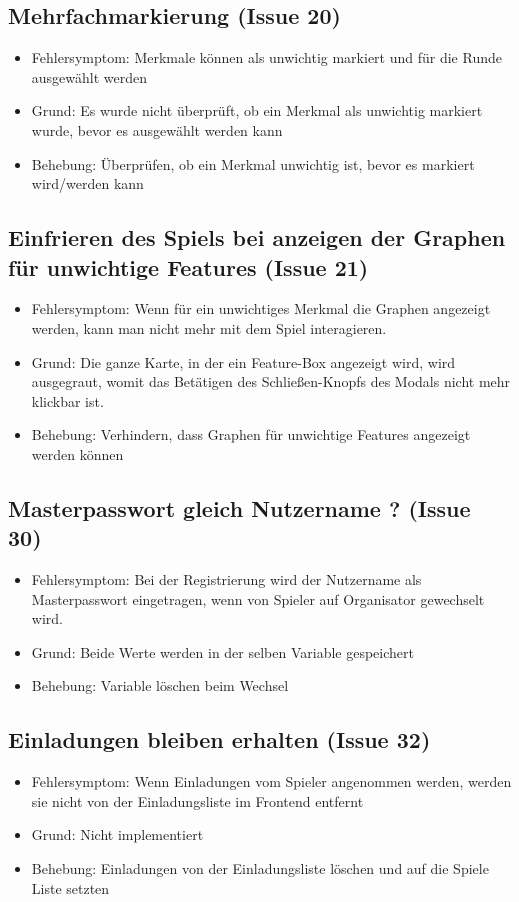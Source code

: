 \documentclass[a4paper]{scrreprt}
\begin{document}
    \subsection{Mehrfachmarkierung (Issue 20)}
    \begin{itemize}
        \item Fehlersymptom: Merkmale können als unwichtig markiert und für die Runde ausgewählt werden
        \item Grund: Es wurde nicht überprüft, ob ein Merkmal als unwichtig markiert wurde, bevor es ausgewählt werden kann
        \item Behebung: Überprüfen, ob ein Merkmal unwichtig ist, bevor es markiert wird/werden kann
    \end{itemize}
    \subsection{Einfrieren des Spiels bei anzeigen der Graphen für unwichtige Features (Issue 21)}
    \begin{itemize}
        \item Fehlersymptom: Wenn für ein unwichtiges Merkmal die Graphen angezeigt werden, kann man nicht mehr mit dem Spiel interagieren.
        \item Grund: Die ganze Karte, in der ein Feature-Box angezeigt wird, wird ausgegraut, womit das Betätigen des Schließen-Knopfs des Modals nicht mehr klickbar ist.
        \item Behebung: Verhindern, dass Graphen für unwichtige Features angezeigt werden können
    \end{itemize}
    \subsection{Masterpasswort gleich Nutzername ? (Issue 30)}
    \begin{itemize}
        \item Fehlersymptom: Bei der Registrierung wird der Nutzername als Masterpasswort eingetragen, wenn von Spieler auf Organisator gewechselt wird.
        \item Grund: Beide Werte werden in der selben Variable gespeichert
        \item Behebung: Variable löschen beim Wechsel
    \end{itemize}
    \subsection{Einladungen bleiben erhalten (Issue 32)}
    \begin{itemize}
        \item Fehlersymptom: Wenn Einladungen vom Spieler angenommen werden, werden sie nicht von der Einladungsliste im Frontend entfernt
        \item Grund: Nicht implementiert
        \item Behebung: Einladungen von der Einladungsliste löschen und auf die Spiele Liste setzten
    \end{itemize}
\end{document}
